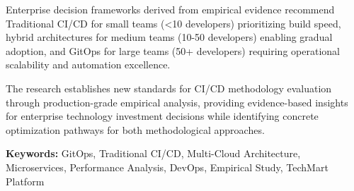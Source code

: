 Enterprise decision frameworks derived from empirical evidence recommend Traditional CI/CD for small teams (<10 developers) prioritizing build speed, hybrid architectures for medium teams (10-50 developers) enabling gradual adoption, and GitOps for large teams (50+ developers) requiring operational scalability and automation excellence.

The research establishes new standards for CI/CD methodology evaluation through production-grade empirical analysis, providing evidence-based insights for enterprise technology investment decisions while identifying concrete optimization pathways for both methodological approaches.

\textbf{Keywords:} GitOps, Traditional CI/CD, Multi-Cloud Architecture, Microservices, Performance Analysis, DevOps, Empirical Study, TechMart Platform

\newpage